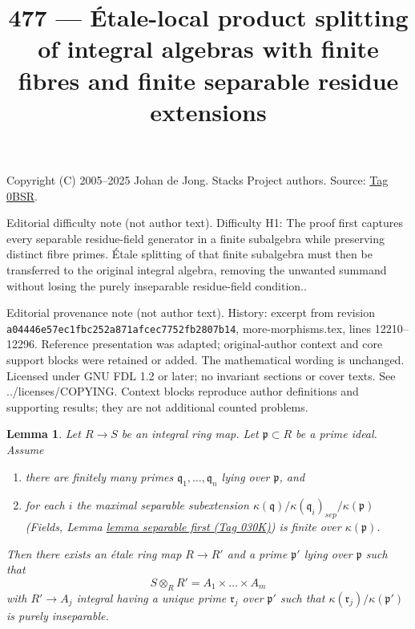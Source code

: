 \documentclass{amsart}
\theoremstyle{plain}
\newtheorem{lemma}[subsection]{Lemma}
\theoremstyle{definition}
\theoremstyle{remark}
\numberwithin{equation}{subsection}
\begin{document}
\title[Stacks Project, Tag 0BSR]{477 --- Étale-local product splitting of integral algebras with finite fibres and finite separable residue extensions}
\maketitle
\noindent Copyright (C) 2005--2025 Johan de Jong. Stacks Project authors. Source: \href{https://stacks.math.columbia.edu/tag/0BSR}{Tag 0BSR}.

\noindent Editorial difficulty note (not author text). Difficulty H1: The proof first captures every separable residue-field generator in a finite subalgebra while preserving distinct fibre primes. Étale splitting of that finite subalgebra must then be transferred to the original integral algebra, removing the unwanted summand without losing the purely inseparable residue-field condition..

\noindent Editorial provenance note (not author text). History: excerpt from revision \texttt{a0444\allowbreak 6e57e\allowbreak c1fbc\allowbreak 252a8\allowbreak 71afc\allowbreak ec775\allowbreak 2fb28\allowbreak 07b14}, more-morphisms.tex, lines 12210--12296. Reference presentation was adapted; original-author context and core support blocks were retained or added. The mathematical wording is unchanged. Licensed under GNU FDL 1.2 or later; no invariant sections or cover texts. See ../licenses/COPYING. Context blocks reproduce author definitions and supporting results; they are not additional counted problems.

\begin{lemma}
\label{lemma-etale-makes-integral-split}
Let $R \to S$ be an integral ring map. Let $\mathfrak p \subset R$ be a prime
ideal. Assume
\begin{enumerate}
\item there are finitely many primes $\mathfrak q_1, \ldots, \mathfrak q_n$
lying over $\mathfrak p$, and
\item for each $i$ the maximal separable subextension
$\kappa(\mathfrak q)/\kappa(\mathfrak q_i)_{sep}/\kappa(\mathfrak p)$
(Fields, Lemma \href{https://stacks.math.columbia.edu/tag/030K}{lemma separable first (Tag 030K)})
is finite over $\kappa(\mathfrak p)$.
\end{enumerate}
Then there exists an \'etale ring map $R \to R'$ and a prime
$\mathfrak p'$ lying over $\mathfrak p$ such that
$$
S \otimes_R R' = A_1 \times \ldots \times A_m
$$
with $R' \to A_j$ integral having a unique prime $\mathfrak r_j$
over $\mathfrak p'$ such that $\kappa(\mathfrak r_j)/\kappa(\mathfrak p')$
is purely inseparable.
\end{lemma}
\end{document}
